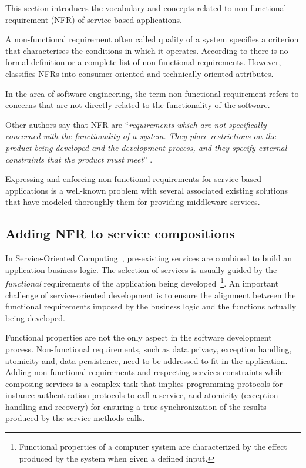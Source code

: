 
This section introduces the vocabulary and concepts related to non-functional
requirement (NFR) of service-based applications.

A non-functional requirement often called quality of a system specifies a criterion  that characterises   the conditions in which it  operates.
According to \cite{MylopoulosBook99} there is no  formal definition or a
complete list of non-functional requirements. However, \cite{MylopoulosCN92} classifies NFRs  into consumer-oriented and
technically-oriented attributes.
 
In the area of software engineering, the term non-functional requirement refers to concerns that are not directly related to the functionality of the software.

Other authors say that NFR are ``\textit{requirements which are not specifically concerned with
the functionality of a system. They place restrictions on the product being developed and the 
development process, and they specify external constraints that the product 
must meet}'' \cite{Chung2009}.

Expressing and enforcing non-functional requirements for service-based
applications is a well-known problem with several associated existing solutions that have modeled
thoroughly them for providing middleware services. 

\subsection{Adding NFR to service compositions}

In Service-Oriented Computing~\cite{Papazoglou2007}, pre-existing services are
combined to build an application business logic.
The selection of services is usually guided by the \textit{functional} requirements of the application being developed~\cite{2,decastro1,PapazoglouH06}\footnote{Functional properties of a computer system are characterized by the effect produced by the system when given a defined input.}.
An important challenge of service-oriented development is  to ensure the alignment between the functional requirements imposed by the business logic and the functions actually being developed.

Functional properties are not the only  aspect in the software development process.
Non-functional requirements, such as data privacy, exception handling, atomicity  and, data persistence, need to be addressed  to fit in the application.
Adding non-functional requirements and respecting services constraints while composing services is a complex task that implies programming  protocols for instance authentication protocols to call a service, and atomicity (exception handling and recovery) for ensuring a true synchronization of the results produced by the service methods calls.

